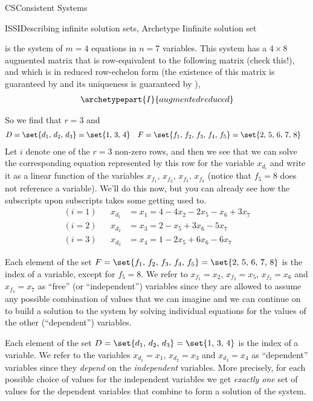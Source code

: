 \begin{subsect}{CS}{Consistent Systems}
%
\begin{example}{ISSI}{Describing infinite solution sets, Archetype I}{infinite solution set}
\begin{para} is the system of $m=4$ equations in $n=7$ variables.
%
%
This system has a $4\times 8$ augmented matrix that is row-equivalent to the following matrix (check this!), and which is in reduced row-echelon form (the existence of this matrix is guaranteed by  and its uniqueness is guaranteed by ),
%
\begin{align*}
\archetypepart{I}{augmentedreduced}\end{align*}
\end{para}
%
\begin{para}So we find that $r=3$ and
%
\begin{align*}
D&=\set{d_1,\,d_2,\,d_3}=\set{1,\,3,\,4}
&
F&=\set{f_1,\,f_2,\,f_3,\,f_4,\,f_5}=\set{2,\,5,\,6,\,7,\,8}
\end{align*}
Let $i$ denote one of the $r=3$ non-zero rows, and then we see that we can solve the corresponding equation represented by this row for the variable  $x_{d_i}$ and write it as a linear function of the variables $x_{f_1},\,x_{f_2},\,x_{f_3},\,x_{f_4}$ (notice that $f_5=8$ does not reference a variable).  We'll do this now, but you can already see how the subscripts upon subscripts takes some getting used to.
%
\begin{align*}
(i=1)& & x_{d_1}&=x_1=4-4x_2-2x_5-x_6+3x_7\\
(i=2)& & x_{d_2}&=x_3=2-x_5+3x_6-5x_7\\
(i=3)& & x_{d_3}&=x_4=1-2x_5+6x_6-6x_7
\end{align*}
\end{para}
%
\begin{para}Each element of the set $F=\set{f_1,\,f_2,\,f_3,\,f_4,\,f_5}=\set{2,\,5,\,6,\,7,\,8}$ is the index of a variable, except for $f_5=8$.  We refer to $x_{f_1}=x_2$, $x_{f_2}=x_5$, $x_{f_3}=x_6$ and $x_{f_4}=x_7$ as ``free'' (or ``independent'') variables since they are allowed to assume any possible combination of values that we can imagine and we can continue on to build a solution to the system by solving individual equations for the values of the other (``dependent'') variables.\end{para}
%
\begin{para}Each element of the set $D=\set{d_1,\,d_2,\,d_3}=\set{1,\,3,\,4}$ is the index of a variable.  We refer to the variables $x_{d_1}=x_1$, $x_{d_2}=x_3$ and $x_{d_3}=x_4$ as  ``dependent'' variables since they {\em depend} on the {\em independent} variables.  More precisely, for each possible choice of values for the independent variables we get {\em exactly one} set of values for the dependent variables that combine to form a solution of the system.\end{para}

\end{example}
\end{subsect}
